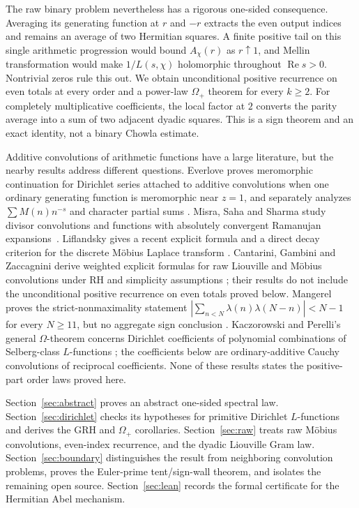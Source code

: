 \documentclass[11pt]{article}
\theoremstyle{remark}
\newcommand{\Rea}{\operatorname{Re}}
\newcommand{\GRH}{\mathrm{GRH}}
\begin{document}
The raw binary problem nevertheless has a rigorous one-sided consequence.  Averaging its
generating function at $r$ and $-r$ extracts the even output indices and remains an average of two
Hermitian squares.  A finite positive tail on this single arithmetic progression would bound
$A_\chi(r)$ as $r\uparrow1$, and Mellin transformation would make $1/L(s,\chi)$ holomorphic
throughout $\Rea s>0$.  Nontrivial zeros rule this out.  We obtain unconditional positive
recurrence on even totals at every order and a power-law $\Omega_+$ theorem for every $k\geq2$.
For completely multiplicative coefficients, the local factor at $2$ converts the parity average
into a sum of two adjacent dyadic squares.  This is a sign theorem and an exact identity, not a
binary Chowla estimate.

Additive convolutions of arithmetic functions have a large literature, but the nearby results
address different questions.  Everlove proves meromorphic continuation for Dirichlet series
attached to additive convolutions when one ordinary generating function is meromorphic near
$z=1$, and separately analyzes $\sum M(n)n^{-s}$ and character partial sums
\cite{Everlove}.  Misra, Saha and Sharma study divisor convolutions and functions with absolutely
convergent Ramanujan expansions~\cite{MisraSahaSharma}.  Liflandsky gives a recent explicit
formula and a direct decay criterion for the discrete Möbius Laplace transform
\cite{Liflandsky}.  Cantarini, Gambini and Zaccagnini derive weighted explicit formulas for raw
Liouville and Möbius convolutions under RH and simplicity assumptions
\cite{CantariniGambiniZaccagnini}; their results do not include the unconditional positive
recurrence on even totals proved below.  Mangerel proves the strict-nonmaximality statement
$|\sum_{n<N}\lambda(n)\lambda(N-n)|<N-1$ for every $N\geq11$, but no aggregate sign conclusion
\cite{Mangerel}.  Kaczorowski and Perelli's general $\Omega$-theorem concerns Dirichlet
coefficients of polynomial combinations of Selberg-class $L$-functions
\cite{KaczorowskiPerelli}; the coefficients below are ordinary-additive Cauchy convolutions of
reciprocal coefficients.  None of these results states the positive-part order laws proved here.

Section~\ref{sec:abstract} proves an abstract one-sided spectral law.  Section~\ref{sec:dirichlet}
checks its hypotheses for primitive Dirichlet $L$-functions and derives the $\GRH$ and
$\Omega_+$ corollaries.  Section~\ref{sec:raw} treats raw Möbius convolutions, even-index
recurrence, and the dyadic Liouville Gram law.  Section~\ref{sec:boundary} distinguishes the result from neighboring
convolution problems, proves the Euler-prime tent/sign-wall theorem, and isolates the remaining
open source.  Section~\ref{sec:lean} records the
formal certificate for the Hermitian Abel mechanism.
\end{document}
